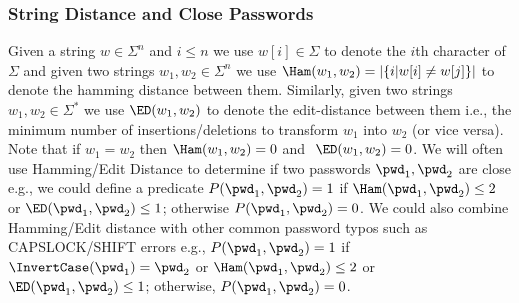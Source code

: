 \subsubsection{String Distance and Close Passwords} Given a string $w \in \Sigma^n$ and $i \leq n$ we use $w[i] \in \Sigma$ to denote the $i$th character of $\Sigma$ and given two strings $w_1,w_2 \in \Sigma^n$ we use $\Ham(w_1,w_2) = \left|\{ i | w[i] \neq w[j]\} \right|$ to denote the hamming distance between them. Similarly, given two strings $w_1, w_2 \in \Sigma^*$ we use $\ED(w_1,w_2)$ to denote the edit-distance between them i.e., the minimum number of insertions/deletions to transform $w_1$ into $w_2$ (or vice versa). Note that if $w_1=w_2$ then $\Ham(w_1,w_2)=0$ and $\
\ED(w_1,w_2)=0$. We will often use Hamming/Edit Distance to determine if two passwords $\pwd_1,\pwd_2$ are close e.g., we could define a predicate $P(\pwd_1,\pwd_2)=1$ if $\Ham(\pwd_1, \pwd_2) \leq 2$ or $\ED(\pwd_1, \pwd_2) \leq 1$; otherwise $P(\pwd_1,\pwd_2)=0$. We could also combine Hamming/Edit distance with other common password typos such as CAPSLOCK/SHIFT errors e.g., $P(\pwd_1, \pwd_2)=1$ if $\InvertCase(\pwd_1) = \pwd_2$ or $\Ham(\pwd_1, \pwd_2) \leq 2$ or $\ED(\pwd_1, \pwd_2) \leq 1$; otherwise, $P(\pwd_1,\pwd_2)=0$.